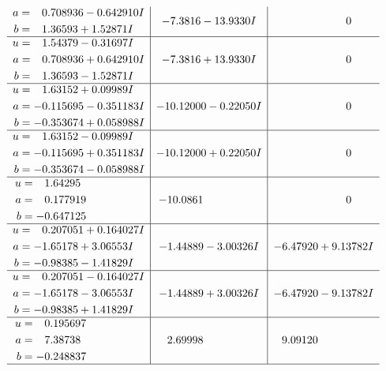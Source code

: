 \documentclass[1p]{elsarticle_modified}
\theoremstyle{definition}
\begin{document}
$$\begin{array}{c|c|c}
\begin{aligned}
a &= \phantom{-}0.708936 - 0.642910 I \\
b &= \phantom{-}1.36593 + 1.52871 I\end{aligned}
 & -7.3816 - 13.9330 I & \phantom{-0.000000 } 0 \\ \hline\begin{aligned}
u &= \phantom{-}1.54379 - 0.31697 I \\
a &= \phantom{-}0.708936 + 0.642910 I \\
b &= \phantom{-}1.36593 - 1.52871 I\end{aligned}
 & -7.3816 + 13.9330 I & \phantom{-0.000000 } 0 \\ \hline\begin{aligned}
u &= \phantom{-}1.63152 + 0.09989 I \\
a &= -0.115695 - 0.351183 I \\
b &= -0.353674 + 0.058988 I\end{aligned}
 & -10.12000 - 0.22050 I & \phantom{-0.000000 } 0 \\ \hline\begin{aligned}
u &= \phantom{-}1.63152 - 0.09989 I \\
a &= -0.115695 + 0.351183 I \\
b &= -0.353674 - 0.058988 I\end{aligned}
 & -10.12000 + 0.22050 I & \phantom{-0.000000 } 0 \\ \hline\begin{aligned}
u &= \phantom{-}1.64295\phantom{ +0.000000I} \\
a &= \phantom{-}0.177919\phantom{ +0.000000I} \\
b &= -0.647125\phantom{ +0.000000I}\end{aligned}
 & -10.0861\phantom{ +0.000000I} & \phantom{-0.000000 } 0 \\ \hline\begin{aligned}
u &= \phantom{-}0.207051 + 0.164027 I \\
a &= -1.65178 + 3.06553 I \\
b &= -0.98385 - 1.41829 I\end{aligned}
 & -1.44889 - 3.00326 I & -6.47920 + 9.13782 I \\ \hline\begin{aligned}
u &= \phantom{-}0.207051 - 0.164027 I \\
a &= -1.65178 - 3.06553 I \\
b &= -0.98385 + 1.41829 I\end{aligned}
 & -1.44889 + 3.00326 I & -6.47920 - 9.13782 I \\ \hline\begin{aligned}
u &= \phantom{-}0.195697\phantom{ +0.000000I} \\
a &= \phantom{-}7.38738\phantom{ +0.000000I} \\
b &= -0.248837\phantom{ +0.000000I}\end{aligned}
 & \phantom{-}2.69998\phantom{ +0.000000I} & \phantom{-}9.09120\phantom{ +0.000000I}\\
 \hline 
 \end{array}$$\newpage\newpage\renewcommand{\arraystretch}{1}
\end{document}

